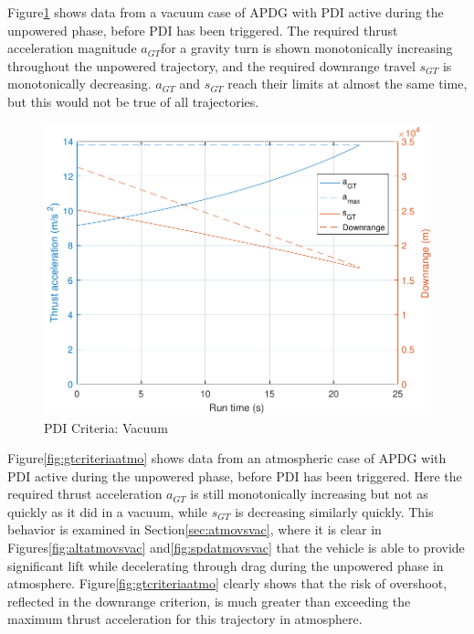 Figure\:\ref{fig:gtcriteriavac} shows data from a vacuum case of APDG with PDI active during the unpowered phase, before PDI has been triggered. The required thrust acceleration magnitude $a_{GT}$for a gravity turn is shown monotonically increasing throughout the unpowered trajectory, and the required downrange travel $s_{GT}$ is monotonically decreasing. $a_{GT}$ and $s_{GT}$ reach their limits at almost the same time, but this would not be true of all trajectories.


\begin{figure}[H]
	\centering
	\begin{minipage}{4.3 in}
		\includegraphics[width=\linewidth]{Figures/gtcriteriavac.pdf}
		\caption{PDI Criteria: Vacuum \label{fig:gtcriteriavac} }
	\end{minipage}
\end{figure}

Figure\:\ref{fig:gtcriteriaatmo} shows data from an atmospheric case of APDG with PDI active during the unpowered phase, before PDI has been triggered. Here the required thrust acceleration $a_{GT}$ is still monotonically increasing but not as quickly as it did in a vacuum, while $s_{GT}$ is decreasing similarly quickly. This behavior is examined in Section\:\ref{sec:atmovsvac}, where it is clear in Figures\:\ref{fig:altatmovsvac} and\:\ref{fig:spdatmovsvac} that the vehicle is able to provide significant lift while decelerating through drag during the unpowered phase in atmosphere. Figure\:\ref{fig:gtcriteriaatmo} clearly shows that the risk of overshoot, reflected in the downrange criterion, is much greater than exceeding the maximum thrust acceleration for this trajectory in atmosphere.

